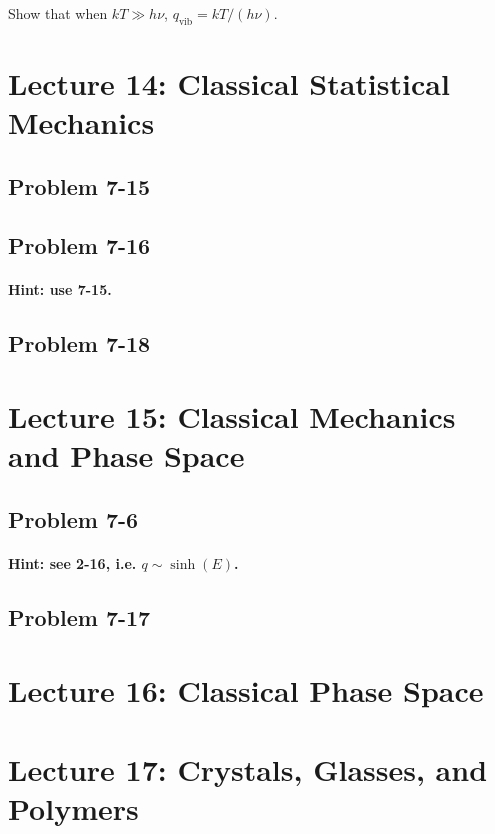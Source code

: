 \documentclass[reprint]{revtex4-1}
\numberwithin{equation}{section}
\begin{document}
Show that when $kT \gg h\nu$, $q_\mathrm{vib} = kT/(h\nu)$.


\section{Lecture 14: Classical Statistical Mechanics}

\subsection{Problem 7-15}

\subsection{Problem 7-16}

\paragraph{Hint: use 7-15.}

\subsection{Problem 7-18}

\section{Lecture 15: Classical Mechanics and Phase Space}

\subsection{Problem 7-6}

\paragraph{Hint: see 2-16, i.e. $q \sim \sinh(E)$.}

\subsection{Problem 7-17}

\section{Lecture 16: Classical Phase Space}

\section{Lecture 17: Crystals, Glasses, and Polymers}
\end{document}
